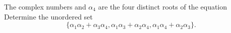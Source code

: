 The complex numbers    and $\alpha_4$ are the four distinct roots of the equation   Determine the unordered set \[\{\alpha_1\alpha_2+\alpha_3\alpha_4,\alpha_1\alpha_3+\alpha_2\alpha_4,\alpha_1\alpha_4+\alpha_2\alpha_3\}.\]